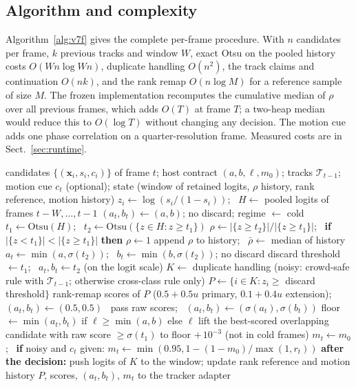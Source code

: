 \documentclass[pdflatex,sn-mathphys-num]{sn-jnl}
\begin{document}
\subsection{Algorithm and complexity}\label{sec:algorithm}
Algorithm~\ref{alg:v7f} gives the complete per-frame procedure. With $n$ candidates per frame, $k$ previous tracks and window $W$, exact Otsu on the pooled history costs $O(Wn\log Wn)$, duplicate handling $O(n^2)$, the track claims and continuation $O(nk)$, and the rank remap $O(n\log M)$ for a reference sample of size $M$. The frozen implementation recomputes the cumulative median of $\rho$ over all previous frames, which adds $O(T)$ at frame $T$; a two-heap median would reduce this to $O(\log T)$ without changing any decision. The motion cue adds one phase correlation on a quarter-resolution frame. Measured costs are in Sect.~\ref{sec:runtime}.

\begin{algorithm}[t]
\caption{V7f decision for frame $t$ (frozen policy)}\label{alg:v7f}
\footnotesize
\begin{algorithmic}[1]
\Require candidates $\{(\mathbf{x}_i,s_i,c_i)\}$ of frame $t$; host contract $(a,b,\ell,m_0)$; tracks $\mathcal{T}_{t-1}$; motion cue $c_t$ (optional); state (window of retained logits, $\rho$ history, rank reference, motion history)
\State $z_i\gets\log(s_i/(1-s_i))$; \ $H\gets$ pooled logits of frames $t-W,\dots,t-1$
 
  \State $(a_t,b_t)\gets(a,b)$; no discard; regime $\gets$ cold
\Else
  \State $t_1\gets\mathrm{Otsu}(H)$; \ $t_2\gets\mathrm{Otsu}(\{z\in H:z\ge t_1\})$
  \State $\rho\gets|\{z\ge t_2\}|/|\{z\ge t_1\}|$; \ \textbf{if} $|\{z<t_1\}|<|\{z\ge t_1\}|$ \textbf{then} $\rho\gets 1$
  \State append $\rho$ to history; \ $\bar\rho\gets$ median of history
   
     \State $a_t\gets\min(a,\sigma(t_2))$; \ $b_t\gets\min(b,\sigma(t_2))$; no discard
  \Else {}
     \State discard threshold $\gets t_1$; \ $a_t, b_t\gets t_2$ (on the logit scale)
  \EndIf
\EndIf
\State $K\gets$ duplicate handling (noisy: crowd-safe rule with $\mathcal{T}_{t-1}$; otherwise cross-class rule only)
\State $P\gets\{i\in K: z_i\ge$ discard threshold$\}$
 rank-remap scores of $P$ ($0.5+0.5u$ primary, $0.1+0.4u$ extension); \ $(a_t,b_t)\gets(0.5,0.5)$
\Else \ pass raw scores; \ $(a_t,b_t)\gets(\sigma(a_t),\sigma(b_t))$ \EndIf
\State floor $\gets\min(a_t,b_t)$ if $\ell\ge\min(a,b)$ else $\ell$
  \State lift the best-scored overlapping candidate with raw score $\ge\sigma(t_1)$ to floor $+\,10^{-3}$ (not in cold frames)
\EndFor
\State $m_t\gets m_0$; \ \textbf{if} noisy and $c_t$ given: $m_t\gets\min(0.95,1-(1-m_0)/\max(1,r_t))$
\State \textbf{after the decision:} push logits of $K$ to the window; update rank reference and motion history
\State \Return $P$, scores, $(a_t,b_t)$, $m_t$ to the tracker adapter
\end{algorithmic}
\end{algorithm}
\end{document}
